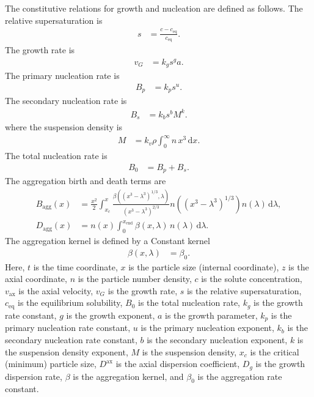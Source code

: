 \documentclass{article}
\begin{document}
The constitutive relations for growth and nucleation are defined as follows.
The relative supersaturation is
\begin{align}
    s
    &= \frac{c - c_{\mathrm{eq}}}{c_{\mathrm{eq}}}.
\end{align}
The growth rate is
\begin{align}
    v_{G}
    &= k_{g} s^{g} a.
\end{align}
The primary nucleation rate is
\begin{align}
    B_{p}
    &= k_{p} s^{u}.
\end{align}
The secondary nucleation rate is
\begin{align}
    B_{s}
    &= k_{b} s^{b} M^{k}.
\end{align}
where the suspension density is
\begin{align}
    M
    &= k_{v} \rho \int_{0}^{\infty} n \, x^{3} \, \mathrm{d}x.
\end{align}
The total nucleation rate is
\begin{align}
    B_{0}
    &= B_{p}
        + B_{s}.
\end{align}
The aggregation birth and death terms are
\begin{align}
    B_{\mathrm{agg}}(x)
    &= \frac{x^{2}}{2} \int_{x_{c}}^{x} \frac{\beta\!\left((x^{3} - \lambda^{3})^{1/3}, \lambda\right)}{(x^{3} - \lambda^{3})^{2/3}} n\!\left((x^{3} - \lambda^{3})^{1/3}\right) n(\lambda) \, \mathrm{d}\lambda,
    \\
    D_{\mathrm{agg}}(x)
    &= n(x) \int_{0}^{x_{\mathrm{end}}} \beta(x, \lambda) \, n(\lambda) \, \mathrm{d}\lambda.
\end{align}
The aggregation kernel is defined by a Constant kernel
\begin{align}
    \beta(x, \lambda)
    &= \beta_{0}.
\end{align}
Here, $t$ is the time coordinate, $x$ is the particle size (internal coordinate), $z$ is the axial coordinate, $n$ is the particle number density, $c$ is the solute concentration, $v_{\mathrm{ax}}$ is the axial velocity, $v_{G}$ is the growth rate, $s$ is the relative supersaturation, $c_{\mathrm{eq}}$ is the equilibrium solubility, $B_{0}$ is the total nucleation rate, $k_{g}$ is the growth rate constant, $g$ is the growth exponent, $a$ is the growth parameter, $k_{p}$ is the primary nucleation rate constant, $u$ is the primary nucleation exponent, $k_{b}$ is the secondary nucleation rate constant, $b$ is the secondary nucleation exponent, $k$ is the suspension density exponent, $M$ is the suspension density, $x_{c}$ is the critical (minimum) particle size, $D^{\mathrm{ax}}$ is the axial dispersion coefficient, $D_{g}$ is the growth dispersion rate, $\beta$ is the aggregation kernel, and $\beta_{0}$ is the aggregation rate constant.
\end{document}
